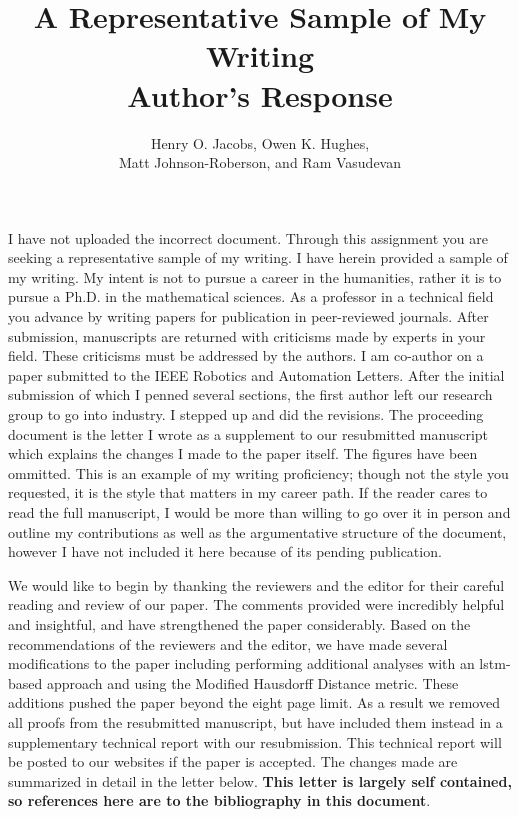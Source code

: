\documentclass[usenames,dvipsnames]{article}
\title{\LARGE A Representative Sample of My Writing \\ \textbf{Author's Response} }
\author{Henry O. Jacobs, Owen K. Hughes, \\ Matt Johnson-Roberson, and Ram Vasudevan }
\newcommand{\todo}[1]{\textcolor{red}{#1}}
\begin{document}
\maketitle


I have not uploaded the incorrect document. Through this assignment you are seeking a representative sample of my writing. I have herein provided a sample of my writing. My intent is not to pursue a career in the humanities, rather it is to pursue a Ph.D. in the mathematical sciences. As a professor in a technical field you advance by writing papers for publication in peer-reviewed journals. After submission, manuscripts are returned with criticisms made by experts in your field. These criticisms must be addressed by the authors. I am co-author on a paper submitted to the IEEE Robotics and Automation Letters. After the initial submission of which I penned several sections, the first author left our research group to go into industry. I stepped up and did the revisions. The proceeding document is the letter I wrote as a supplement to our resubmitted manuscript which explains the changes I made to the paper itself. The figures have been ommitted. This is an example of my writing proficiency; though not the style you requested, it is the style that matters in my career path. If the reader cares to read the full manuscript, I would be more than willing to go over it in person and outline my contributions as well as the argumentative structure of the document, however I have not included it here because of its pending publication.

We would like to begin by thanking the reviewers and the editor for their careful reading and review of our paper.
The comments provided were incredibly helpful and insightful, and have strengthened the paper considerably.
Based on the recommendations of the reviewers and the editor, we have made several modifications to the paper including performing additional analyses with an lstm-based approach and using the Modified Hausdorff Distance metric. 
These additions pushed the paper beyond the eight page limit. 
As a result we removed all proofs from the resubmitted manuscript, but have included them instead in a supplementary technical report with our resubmission.
This technical report will be posted to our websites if the paper is accepted. 
The changes made are summarized in detail in the letter below. \textbf{This letter is largely self contained, so references here are to the bibliography in this document}.
\end{document}
